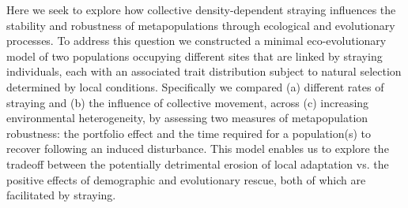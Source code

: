 \documentclass{revtex4}
\begin{document}

% 

Here we seek to explore how collective density-dependent straying influences the stability and robustness of metapopulations through ecological and evolutionary processes.
To address this question we constructed a minimal eco-evolutionary model of two populations occupying different sites that are linked by straying individuals, each with an associated trait distribution subject to natural selection determined by local conditions.
Specifically we compared (a) different rates of straying and (b) the influence of collective movement, across (c) increasing environmental heterogeneity, by assessing two measures of metapopulation robustness: the portfolio effect and the time required for a population(s) to recover following an induced disturbance. 
This model enables us to explore the tradeoff between the potentially detrimental erosion of local adaptation vs. the positive effects of demographic and evolutionary rescue, both of which are facilitated by straying. %
\end{document}
